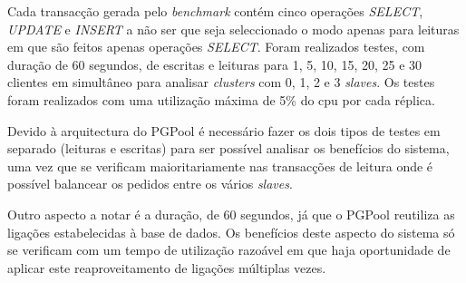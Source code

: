 Cada transacção gerada pelo \textit{benchmark} contém cinco operações \textit{SELECT}, \textit{UPDATE} e \textit{INSERT} a não ser que seja seleccionado o modo apenas para leituras em que são feitos apenas operações \textit{SELECT}. Foram realizados testes, com duração de 60 segundos, de escritas e leituras para 1, 5, 10, 15, 20, 25 e 30 clientes em simultâneo para analisar \textit{clusters} com 0, 1, 2 e 3 \textit{slaves}. Os testes foram realizados com uma utilização máxima de 5\% do cpu por cada réplica.\par

Devido à arquitectura do PGPool é necessário fazer os dois tipos de testes em separado (leituras e escritas) para ser possível analisar os benefícios do sistema, uma vez que se verificam maioritariamente nas transacções de leitura onde é possível balancear os pedidos entre os vários \textit{slaves}. 

Outro aspecto a notar é a duração, de 60 segundos, já que o PGPool reutiliza as ligações estabelecidas à base de dados. Os benefícios deste aspecto do sistema só se verificam com um tempo de utilização razoável em que haja oportunidade de aplicar este reaproveitamento de ligações múltiplas vezes.
